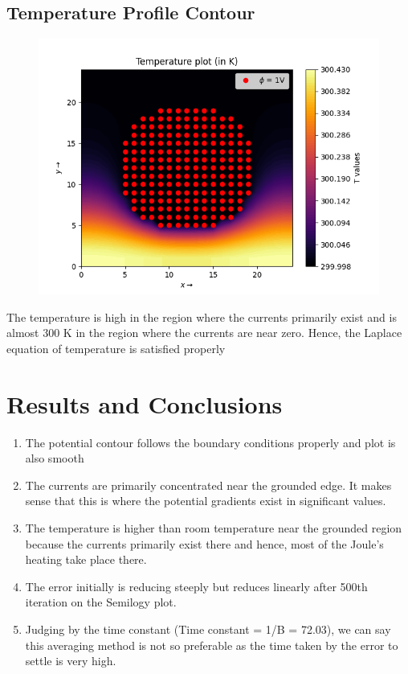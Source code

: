 \documentclass[12pt, a4paper]{article}
\begin{document}
\subsection{Temperature Profile Contour}
\vspace*{-0.5cm}
\begin{figure}[H]
    \centering
    \includegraphics[scale = 0.75]{Figure_7.png}
    \label{fig:sample}
\end{figure}
\vspace*{-0.5cm}
\begin{center}
    The temperature is high in the region where the currents primarily exist and is
almost 300 K in the region where the currents are near zero. Hence, the
Laplace equation of temperature is satisfied properly    
\end{center}

\section{Results and Conclusions}
\begin{enumerate}
    \item The potential contour follows the boundary conditions properly and plot is also smooth
    \item The currents are primarily concentrated near the grounded edge. It makes
    sense that this is where the potential gradients exist in significant values.
    \item The temperature is higher than room temperature near the grounded region because the currents primarily exist there and hence, most of the
    Joule's heating take place there.
    \item The error initially is reducing steeply but reduces linearly after 500th
    iteration on the Semilogy plot.
    \item Judging by the time constant (Time constant = 1/B = 72.03), we can say
    this averaging method is not so preferable as the time taken by the error
    to settle is very high.
\end{enumerate}
\end{document}
